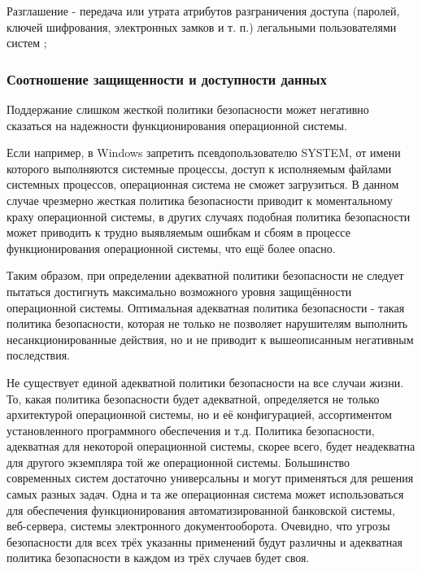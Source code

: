 Разглашение - передача или утрата атрибутов разграничения доступа (паролей, ключей шифрования, электронных замков и т. п.) легальными пользователями систем \cite{Smirnov2007};

\subsubsection{Соотношение защищенности и доступности данных}
Поддержание слишком жесткой политики безопасности может негативно
сказаться на надежности функционирования операционной системы.

Если например, в Windows запретить псевдопользователю SYSTEM, от имени которого выполняются
системные процессы, доступ к исполняемым файлами системных процессов, операционная система не
сможет загрузиться. В данном случае чрезмерно жесткая политика безопасности приводит к
моментальному краху операционной системы, в других случаях подобная политика безопасности может
приводить к трудно выявляемым ошибкам и сбоям в процессе функционирования операционной системы,
что ещё более опасно.

Таким образом, при определении адекватной политики безопасности не следует пытаться достигнуть
максимально возможного уровня защищённости операционной системы. Оптимальная адекватная политика
безопасности - такая политика безопасности, которая не только не позволяет нарушителям выполнить
несанкционированные действия, но и не приводит к вышеописанным негативным последствия.

Не существует единой адекватной политики безопасности на все случаи жизни. То, какая политика
безопасности будет адекватной, определяется не только архитектурой операционной системы, но и её
конфигурацией, ассортиментом установленного программного обеспечения и т.д. Политика безопасности,
адекватная для некоторой операционной системы, скорее всего, будет неадекватна для другого
экземпляра той же операционной системы. Большинство современных систем достаточно универсальны и
могут применяться для решения самых разных задач. Одна и та же операционная система может
использоваться для обеспечения функционирования автоматизированной банковской системы, веб-сервера,
системы электронного документооборота. Очевидно, что угрозы безопасности для всех трёх указанны
применений будут различны и адекватная политика безопасности в каждом из трёх случаев будет своя.

